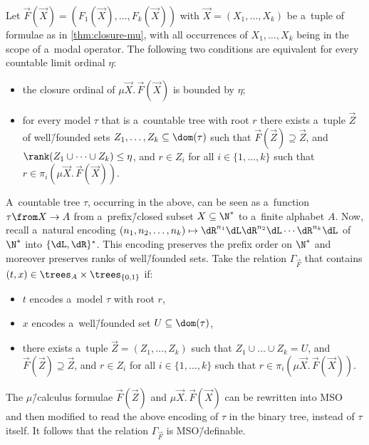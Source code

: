 \documentclass{lmcs}
\numberwithin{equation}{section}
\numberwithin{figure}{section}
\begin{document}
\begin{cor}\label{cor:mu-tree}
	Let $\vec{F}(\vec{X})=(F_1(\vec{X}),\dots,F_k(\vec{X}))$ with $\vec{X}=(X_1,\dots,X_k)$ be a~tuple of formulae as in \cref{thm:closure-mu}, with all occurrences of $X_1,\dots,X_k$ being in the scope of a~modal operator.
	The following two conditions are equivalent for every countable limit ordinal $\eta$:
	\begin{itemize}
	\item	the closure ordinal of $\mu \vec{X}.\,\vec{F}(\vec{X})$ is bounded by $\eta$;
	\item	for every model $\tau$ that is a~countable tree with root $r$ there exists a~tuple $\vec{Z}$ of well\=/founded sets $Z_1,\dots,Z_k\subseteq\dom(\tau)$
		such that $\vec{F}(\vec{Z})\supseteq\vec{Z}$, and $\rank(Z_1\cup\dots\cup Z_k)\leq\eta$, and $r\in Z_i$ for all $i\in\{1,\dots,k\}$ such that $r\in\pi_i(\mu \vec{X}.\,\vec{F}(\vec{X}))$.
	\end{itemize}
\end{cor}
\noindent %
A~countable tree $\tau$, occurring in the  above, can be seen as a~function $\tau\from X\to A$ from a~prefix\=/closed subset $X\subseteq\N^\ast$ to a~finite alphabet $A$.
Now, recall a~natural encoding $(n_1,n_2,\ldots,n_k)\mapsto \dR^{n_1}\dL\dR^{n_2}\dL\cdots\dR^{n_k}\dL$ of $\N^\ast$ into $\{\dL,\dR\}^\ast$.
This encoding preserves the prefix order on $\N^\ast$ and moreover preserves ranks of well\=/founded sets.
Take the relation $\Gamma_{\!\!\vec{F}}$ that contains $(t,x)\in\trees_A\times\trees_{\{0,1\}}$ if:
\begin{itemize}
\item	$t$ encodes a~model $\tau$ with root $r$,
\item	$x$ encodes a~well\=/founded set $U\subseteq\dom(\tau)$,
\item	there exists a~tuple $\vec{Z}=(Z_1,\dots,Z_k)$ such that $Z_1\cup\dots\cup Z_k=U$, and $\vec{F}(\vec{Z})\supseteq\vec{Z}$,
	and $r\in Z_i$ for all $i\in\{1,\dots,k\}$ such that $r\in\pi_i(\mu \vec{X}.\,\vec{F}(\vec{X}))$.
\end{itemize}
The $\mu$\=/calculus formulae $\vec{F}(\vec{Z})$ and $\mu\vec{X}.\,\vec{F}(\vec{X})$ can be rewritten into MSO~\cite{julian-igor-handook}
and then modified to read the above encoding of $\tau$ in the binary tree, instead of $\tau$ itself.
It follows that the relation $\Gamma_{\!\!\vec{F}}$ is MSO\=/definable.
\end{document}
